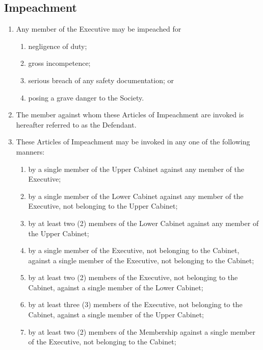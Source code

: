 \documentclass{scrartcl}
\begin{document}
        \subsection{Impeachment}
            \label{executive--impeachment}
            \begin{enumerate}
                \item Any member of the Executive may be impeached for
                    \begin{enumerate}
                        \item negligence of duty;
                        \item gross incompetence;
                        \item serious breach of any safety documentation; or
                        \item posing a grave danger to the Society.
                    \end{enumerate}
                \item The member against whom these Articles of Impeachment are invoked is hereafter referred to as the Defendant.
                \item These Articles of Impeachment may be invoked in any one of the following manners:
                    \begin{enumerate}
                        \item by a single member of the Upper Cabinet against any member of the Executive;
                        \item by a single member of the Lower Cabinet against any member of the Executive, not belonging to the Upper Cabinet;
                        \item by at least two (2) members of the Lower Cabinet against any member of the Upper Cabinet;
                        \item by a single member of the Executive, not belonging to the Cabinet, against a single member of the Executive, not belonging to the Cabinet;
                        \item by at least two (2) members of the Executive, not belonging to the Cabinet, against a single member of the Lower Cabinet;
                        \item by at least three (3) members of the Executive, not belonging to the Cabinet, against a single member of the Upper Cabinet;
                        \item by at least two (2) members of the Membership against a single member of the Executive, not belonging to the Cabinet;

\end{enumerate}
\end{enumerate}
\end{document}
